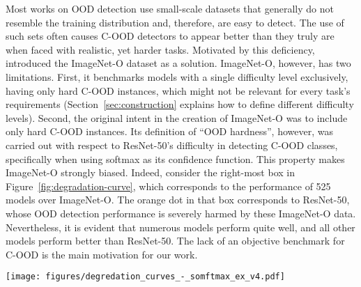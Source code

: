 \documentclass[table]{article} \usepackage{PRIMEarxiv}
\begin{document}
Most works on OOD detection use small-scale datasets that generally do not resemble the training distribution and, therefore, are easy to detect. 
The use of such sets often causes C-OOD detectors to appear better than they truly are when faced with realistic, yet harder tasks. Motivated by this deficiency, \citet{DBLP:conf/cvpr/HendrycksZBSS21} introduced the ImageNet-O dataset as a solution. ImageNet-O, however, has two limitations. First, it benchmarks models with a single difficulty level exclusively, having only hard C-OOD instances, which might not be relevant for every task's requirements (Section~\ref{sec:construction} explains how to define different difficulty levels).
Second, the original intent in the creation of ImageNet-O was to include only hard C-OOD instances. Its definition of ``OOD hardness'', however, was carried out with respect to ResNet-50's difficulty in detecting C-OOD classes, specifically when using softmax as its confidence function.
This property makes ImageNet-O strongly biased. Indeed, consider the right-most box in Figure~\ref{fig:degradation-curve}, which corresponds to the performance of 525 models over ImageNet-O. \textcolor{myorange}{The orange dot} in that box corresponds to ResNet-50, whose OOD detection performance is severely harmed by these ImageNet-O data. Nevertheless, it is evident that numerous models perform quite well, and all other models perform better than ResNet-50. 
The lack of an objective benchmark for C-OOD is the main motivation for our work.
\begin{figure*}[h]
    \centering
    \texttt{[image: figures/degredation\_curves\_-\_somftmax\_ex\_v4.pdf]}
    \caption{OOD performance across severity (difficulty) levels, using the benchmarks produced by our framework.
The detection performance decreases for all models as we increase the difficulty until it reaches near chance detection performance at the highest severity (. The top curve belongs to \textcolor{myteal}{ViT-L/32-384}, which surpasses all models at every severity level. 
    We also observe how success or failure with regard to the previous C-OOD benchmark, ImageNet-O, does not reflect the models' true OOD detection performance since it was designed to specifically fool \textcolor{myorange}{ResNet-50}. At the bottom we provide visual examples for OOD classes from ImageNet-21k that may populate each severity level due to their similarity to ID classes from ImageNet-1k, and in this example, to a Monarch butterfly.}
    \label{fig:degradation-curve}
\end{figure*}
\end{document}
